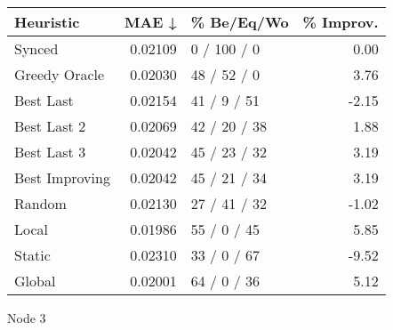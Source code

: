 \begin{tabular}{lrlr}
\toprule
\textbf{Heuristic} & \textbf{MAE ↓} & \textbf{\% Be/Eq/Wo} & \textbf{\% Improv.} \\
\midrule
            Synced &        0.02109 &          0 / 100 / 0 &                0.00 \\
     Greedy Oracle &        0.02030 &          48 / 52 / 0 &                3.76 \\
         Best Last &        0.02154 &          41 / 9 / 51 &               -2.15 \\
       Best Last 2 &        0.02069 &         42 / 20 / 38 &                1.88 \\
       Best Last 3 &        0.02042 &         45 / 23 / 32 &                3.19 \\
    Best Improving &        0.02042 &         45 / 21 / 34 &                3.19 \\
            Random &        0.02130 &         27 / 41 / 32 &               -1.02 \\
             Local &        0.01986 &          55 / 0 / 45 &                5.85 \\
            Static &        0.02310 &          33 / 0 / 67 &               -9.52 \\
            Global &        0.02001 &          64 / 0 / 36 &                5.12 \\
\bottomrule
\end{tabular}
\caption{Node 3}
\label{tab:non_lr01_le1_bs2_3}
